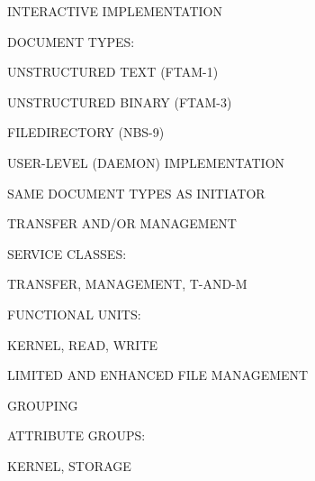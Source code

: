 \begin{bwslide}

\begin{nrtc}
\item	INTERACTIVE IMPLEMENTATION

\item	DOCUMENT TYPES:
    \begin{nrtc}
    \item	UNSTRUCTURED TEXT (FTAM-1)

    \item	UNSTRUCTURED BINARY (FTAM-3)

    \item	FILEDIRECTORY (NBS-9)
    \end{nrtc}
\end{nrtc}
\end{bwslide}


\begin{bwslide}

\begin{nrtc}
\item	USER-LEVEL (DAEMON) IMPLEMENTATION

\item	SAME DOCUMENT TYPES AS INITIATOR

\item	TRANSFER AND/OR MANAGEMENT

\item	SERVICE CLASSES:
    \begin{nrtc}
    \item	TRANSFER, MANAGEMENT, T-AND-M
    \end{nrtc}

\item	FUNCTIONAL UNITS:
    \begin{nrtc}
    \item	KERNEL, READ, WRITE

    \item	LIMITED AND ENHANCED FILE MANAGEMENT

    \item	GROUPING
    \end{nrtc}

\item	ATTRIBUTE GROUPS:
    \begin{nrtc}
    \item	KERNEL, STORAGE
    \end{nrtc}
\end{nrtc}
\end{bwslide}


